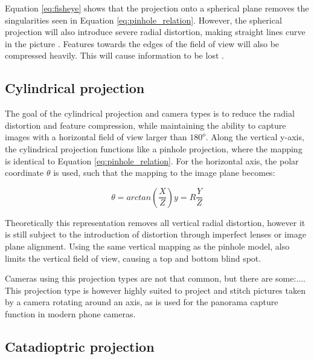 Equation \eqref{eq:fisheye} shows that the projection onto a spherical plane removes the singularities seen in Equation \eqref{eq:pinhole_relation}. However, the spherical projection will also introduce severe radial distortion, making straight lines curve in the picture . Features towards the edges of the field of view will also be compressed heavily. This will cause information to be lost . 

\subsection{Cylindrical projection}

The goal of the cylindrical projection and camera types is to reduce the radial distortion and feature compression, while maintaining the ability to capture images with a horizontal field of view larger than $180^o$. Along the vertical y-axis, the cylindrical projection functions like a pinhole projection, where the mapping is identical to Equation \eqref{eq:pinhole_relation}. For the horizontal axis, the polar coordinate $\theta$ is used, such that the mapping to the image plane becomes:

\begin{subequations}
\begin{equation}
    \theta = arctan\left(\frac{X}{Z}\right)
    \label{eq:cylindrical_theta}
\end{equation}
\begin{equation}
    y = R\frac{Y}{Z}
    \label{eq:cylindrical_y}
\end{equation}
\label{eq:cylindrical}
\end{subequations}

Theoretically this representation removes all vertical radial distortion, however it is still subject to the introduction of distortion through imperfect lenses or image plane alignment. Using the same vertical mapping as the pinhole model, also limits the vertical field of view, causing a top and bottom blind spot.

Cameras using this projection types are not that common, but there are some:.... This projection type is however highly suited to project and stitch pictures taken by a camera rotating around an axis, as is used for the panorama capture function in modern phone cameras.

\subsection{Catadioptric projection}

